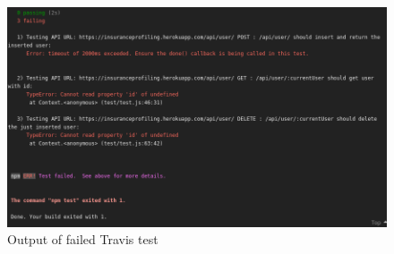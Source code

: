 \documentclass{article}
\begin{document}
\begin{figure}[h]
  \centering
      \includegraphics[width=\textwidth]{images/failed.png}
  \caption{Output of failed Travis test}
  \label{fig:failed}
\end{figure}
\end{document}
